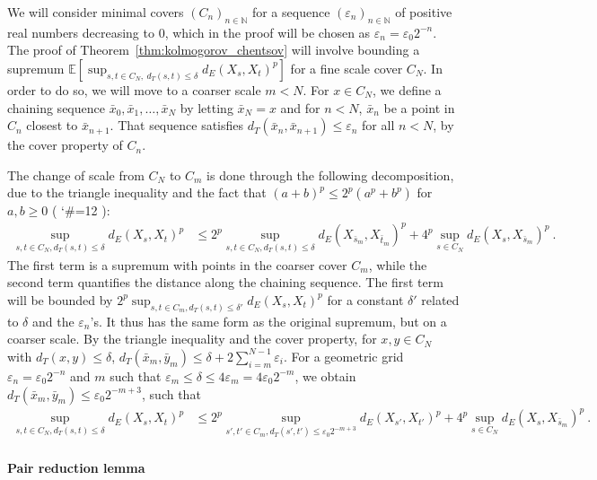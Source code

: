 \documentclass[lean]{Draft}
\makeatletter
\newcommand\leanlink{\begingroup\catcode`\#=12\relax\@leanlink}
\newcommand\@leanlink[2]{\endgroup
\href{#1}
{\texttt{\detokenize{#2}}}}
\newcommand{\docs}[1]{%
\leanlink{https://remydegenne.github.io/brownian-motion/docs/find/?pattern=#1\#doc}
{#1}}
\makeatother
\begin{document}
We will consider minimal covers $(C_n)_{n \in \mathbb{N}}$ for a sequence $(\varepsilon_n)_{n \in \mathbb{N}}$ of positive real numbers decreasing to $0$, which in the proof will be chosen as $\varepsilon_n = \varepsilon_0 2^{-n}$.
The proof of Theorem~\ref{thm:kolmogorov_chentsov} will involve bounding a supremum $\mathbb{E}\left[\sup_{s, t \in C_N, \: d_T(s, t) \le \delta}d_E(X_s, X_t)^p\right]$ for a fine scale cover $C_N$.
In order to do so, we will move to a coarser scale $m < N$.
For $x \in C_N$, we define a chaining sequence $\bar{x}_0, \bar{x}_1, \ldots, \bar{x}_N$ by letting $\bar{x}_N = x$ and for $n < N$, $\bar{x}_n$ be a point in $C_n$ closest to $\bar{x}_{n+1}$.
That sequence satisfies $d_T(\bar{x}_n, \bar{x}_{n+1}) \le \varepsilon_n$ for all $n < N$, by the cover property of $C_n$.

The change of scale from $C_N$ to $C_m$ is done through the following decomposition, due to the triangle inequality and the fact that $(a + b)^p \le 2^p (a^p + b^p)$ for $a, b \ge 0$ (\docs{scale_change_rpow}):
\begin{align*}
  \sup_{s, t \in C_N, d_T(s, t) \le \delta} d_E(X_s, X_t)^p
  &\le 2^p \sup_{s, t \in C_N, d_T(s, t) \le \delta} d_E(X_{\bar{s}_m}, X_{\bar{t}_m})^p + 4^p \sup_{s \in C_N} d_E(X_s, X_{\bar{s}_m})^p
  \: .
\end{align*}
The first term is a supremum with points in the coarser cover $C_m$, while the second term quantifies the distance along the chaining sequence.
The first term will be bounded by $2^p \sup_{s, t \in C_m, d_T(s, t) \le \delta'} d_E(X_s, X_t)^p$ for a constant $\delta'$ related to $\delta$ and the $\varepsilon_n$'s.
It thus has the same form as the original supremum, but on a coarser scale.
By the triangle inequality and the cover property, for $x, y \in C_N$ with $d_T(x, y) \le \delta$, $d_T(\bar{x}_m, \bar{y}_m) \le \delta + 2 \sum_{i=m}^{N-1}\varepsilon_i$.
For a geometric grid $\varepsilon_n = \varepsilon_0 2^{-n}$ and $m$ such that $\varepsilon_m \le \delta \le 4 \varepsilon_m = 4 \varepsilon_0 2^{-m}$, we obtain $d_T(\bar{x}_m, \bar{y}_m) \le \varepsilon_0 2^{-m+3}$, such that
\begin{align}
  \sup_{s, t \in C_N, d_T(s, t) \le \delta} d_E(X_s, X_t)^p
  &\le 2^p \sup_{s', t' \in C_m, d_T(s', t') \le \varepsilon_0 2^{-m+3}} d_E(X_{s'}, X_{t'})^p + 4^p \sup_{s \in C_N} d_E(X_s, X_{\bar{s}_m})^p
  \: . \label{eq:scale_change}
\end{align}

\paragraph{Pair reduction lemma}
\end{document}
